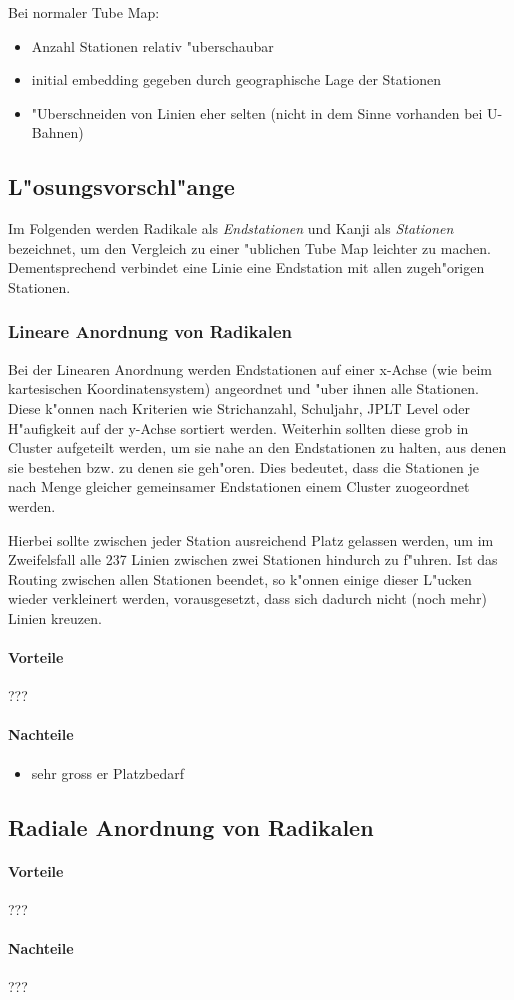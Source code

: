 Bei normaler Tube Map:
\begin{itemize}
\item Anzahl Stationen relativ "uberschaubar
\item initial embedding gegeben durch geographische Lage der Stationen
\item "Uberschneiden von Linien eher selten (nicht in dem Sinne vorhanden bei U-Bahnen)
\end{itemize}

\subsection{L"osungsvorschl"ange}
Im Folgenden werden Radikale als \emph{Endstationen} und Kanji als \emph{Stationen} bezeichnet, um den Vergleich zu einer "ublichen Tube Map leichter zu machen. Dementsprechend verbindet eine Linie eine Endstation mit allen zugeh"origen Stationen.
\subsubsection{Lineare Anordnung von Radikalen}
Bei der Linearen Anordnung werden Endstationen auf einer x-Achse (wie beim kartesischen Koordinatensystem) angeordnet und "uber ihnen alle Stationen. Diese k"onnen nach Kriterien wie Strichanzahl, Schuljahr, JPLT Level oder H"aufigkeit auf der y-Achse sortiert werden. Weiterhin sollten diese grob in Cluster aufgeteilt werden, um sie nahe an den Endstationen zu halten, aus denen sie bestehen bzw. zu denen sie geh"oren. Dies bedeutet, dass die Stationen je nach Menge gleicher gemeinsamer Endstationen einem Cluster zuogeordnet werden.

Hierbei sollte zwischen jeder Station ausreichend Platz gelassen werden, um im Zweifelsfall alle 237 Linien zwischen zwei Stationen hindurch zu f"uhren. Ist das Routing zwischen allen Stationen beendet, so k"onnen einige dieser L"ucken wieder verkleinert werden, vorausgesetzt, dass sich dadurch nicht (noch mehr) Linien kreuzen. 

\paragraph{Vorteile}
???

\paragraph{Nachteile}
\begin{itemize}
\item sehr gross er Platzbedarf
\end{itemize}

\subsection{Radiale Anordnung von Radikalen}

\paragraph{Vorteile}
???

\paragraph{Nachteile}
???